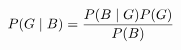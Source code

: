 \documentclass[preview]{standalone}
\begin{document}
\begin{align*}
\special{dvisvgm:raw <g id='unique000'>}P(G \mid B) = \frac{P(B \mid G)P(G)}{P(B)}\special{dvisvgm:raw </g>}
\end{align*}
\end{document}

